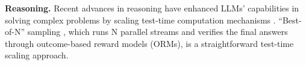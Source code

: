\noindent \textbf{Reasoning.} 
Recent advances in reasoning have enhanced LLMs’ capabilities in solving complex problems by scaling test-time computation mechanisms \cite{hendrycks2021measuringmathematicalproblemsolving,RomeraParedes2023MathematicalDF,ahn2024largelanguagemodelsmathematical,shao2024deepseekmathpushinglimitsmathematical,rein2023gpqagraduatelevelgoogleproofqa,openai_system_card_2024}. 
``Best-of-N'' sampling \cite{cobbe2021trainingverifierssolvemath,yu2024ovmoutcomesupervisedvaluemodels}, which runs N parallel streams and verifies the final answers through outcome-based reward models (ORMs), is a straightforward test-time scaling approach.
